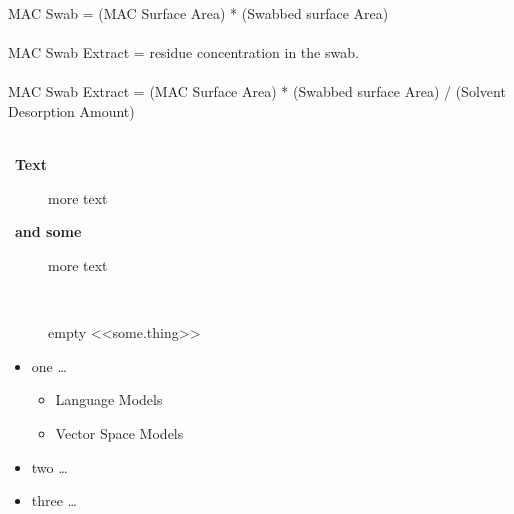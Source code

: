 \documentclass{article}
\let\Item\item
\newcommand\SpecialItem{\renewcommand\item[1][]{\Item[\textbullet~\bfseries##1]}}
\begin{document}
        MAC Swab = (MAC Surface Area) * (Swabbed surface Area)\\\\
        MAC Swab Extract = residue concentration in the swab.\\\\
        MAC Swab Extract = (MAC Surface Area) * (Swabbed surface Area) / (Solvent Desorption Amount)\\\\
        \newpage
        \SpecialItem
        \begin{description}
            \item[Text] more text
            \item[and some] more text
            \item[] empty <<some.thing>>
        \end{description}
        \newpage
        \begin{itemize} 
        \item one \dots{}
            \begin{itemize} 
                \item Language Models
                \item Vector Space Models
            \end{itemize}
        \item two \dots{}
        \item three \dots{}
        \end{itemize}
        
\end{document}
